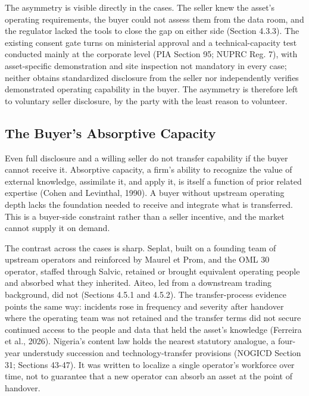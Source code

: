 The asymmetry is visible directly in the cases. The seller knew the
asset's operating requirements, the buyer could not assess them from the
data room, and the regulator lacked the tools to close the gap on either
side (Section 4.3.3). The existing consent gate turns on ministerial
approval and a technical-capacity test conducted mainly at the corporate
level (PIA Section 95; NUPRC Reg. 7), with asset-specific demonstration
and site inspection not mandatory in every case; neither obtains
standardized disclosure from the seller nor independently verifies
demonstrated operating capability in the buyer. The asymmetry is
therefore left to voluntary seller disclosure, by the party with the
least reason to volunteer.

\hypertarget{the-buyers-absorptive-capacity}{%
\subsection{The Buyer's Absorptive
Capacity}\label{the-buyers-absorptive-capacity}}

Even full disclosure and a willing seller do not transfer capability if
the buyer cannot receive it. Absorptive capacity, a firm's ability to
recognize the value of external knowledge, assimilate it, and apply it,
is itself a function of prior related expertise (Cohen and Levinthal,
1990). A buyer without upstream operating depth lacks the foundation
needed to receive and integrate what is transferred. This is a
buyer-side constraint rather than a seller incentive, and the market
cannot supply it on demand.

The contrast across the cases is sharp. Seplat, built on a founding team
of upstream operators and reinforced by Maurel et Prom, and the OML 30
operator, staffed through Salvic, retained or brought equivalent
operating people and absorbed what they inherited. Aiteo, led from a
downstream trading background, did not (Sections 4.5.1 and 4.5.2). The
transfer-process evidence points the same way: incidents rose in
frequency and severity after handover where the operating team was not
retained and the transfer terms did not secure continued access to the
people and data that held the asset's knowledge (Ferreira et al., 2026).
Nigeria's content law holds the nearest statutory analogue, a four-year
understudy succession and technology-transfer provisions (NOGICD Section
31; Sections 43-47). It was written to localize a single operator's
workforce over time, not to guarantee that a new operator can absorb an
asset at the point of handover.

